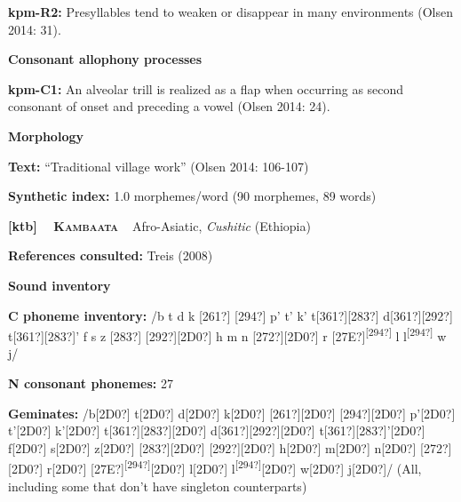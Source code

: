 \begin{styleBody}
\textbf{kpm-R2: }Presyllables tend to weaken or disappear in many environments (Olsen 2014: 31).
\end{styleBody}

\begin{styleBody}
\textbf{Consonant allophony processes}
\end{styleBody}

\begin{styleBody}
\textbf{kpm-C1: }An alveolar trill is realized as a flap when occurring as second consonant of onset and preceding a vowel (Olsen 2014: 24).
\end{styleBody}

\begin{styleBody}
\textbf{Morphology}
\end{styleBody}

\begin{styleBody}
\textbf{Text:} “Traditional village work” (Olsen 2014: 106-107)
\end{styleBody}

\begin{styleBody}
\textbf{Synthetic index: }1.0 morphemes/word (90 morphemes, 89 words)
\end{styleBody}

\clearpage\begin{styleBody}
\textbf{[ktb] }\ \ \textbf{\textsc{Kambaata}}\textbf{\ \ }Afro-Asiatic, \textit{Cushitic} (Ethiopia)
\end{styleBody}

\begin{styleBody}
\textbf{References consulted: }Treis (2008)
\end{styleBody}

\begin{styleBody}
\textbf{Sound inventory}
\end{styleBody}

\begin{styleBody}
\textbf{C phoneme inventory:} /b t d k [261?] [294?] p’ t’ k’ t[361?][283?] d[361?][292?] t[361?][283?]’ f s z [283?] [292?][2D0?] h m n [272?][2D0?] r [27E?]\textsuperscript{[294?]} l l\textsuperscript{[294?]} w j/
\end{styleBody}

\begin{styleBody}
\textbf{N consonant phonemes:} 27
\end{styleBody}

\begin{styleBody}
\textbf{Geminates:} /b[2D0?] t[2D0?] d[2D0?] k[2D0?] [261?][2D0?] [294?][2D0?] p’[2D0?] t’[2D0?] k’[2D0?] t[361?][283?][2D0?] d[361?][292?][2D0?] t[361?][283?]’[2D0?] f[2D0?] s[2D0?] z[2D0?] [283?][2D0?] [292?][2D0?] h[2D0?] m[2D0?] n[2D0?] [272?][2D0?] r[2D0?] [27E?]\textsuperscript{[294?]}[2D0?] l[2D0?] l\textsuperscript{[294?]}[2D0?] w[2D0?] j[2D0?]/ (All, including some that don’t have singleton counterparts)
\end{styleBody}

